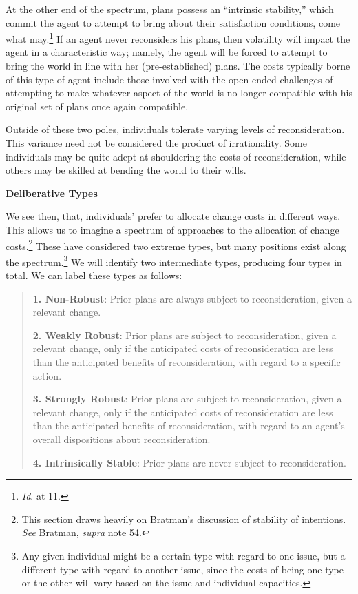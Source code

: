 At the other end of the spectrum, plans possess an ``intrinsic
stability,'' which commit the agent to attempt to bring about their
satisfaction conditions, come what may.\footnote{\emph{Id}. at 11.} If
an agent never reconsiders his plans, then volatility will impact the
agent in a characteristic way; namely, the agent will be forced to
attempt to bring the world in line with her (pre-established) plans. The
costs typically borne of this type of agent include those involved with
the open-ended challenges of attempting to make whatever aspect of the
world is no longer compatible with his original set of plans once again
compatible.

Outside of these two poles, individuals tolerate varying levels of
reconsideration. This variance need not be considered the product of
irrationality. Some individuals may be quite adept at shouldering the
costs of reconsideration, while others may be skilled at bending the
world to their wills.

\textbf{Deliberative Types}

We see then, that, individuals' prefer to allocate change costs in
different ways. This allows us to imagine a spectrum of approaches to
the allocation of change costs.\footnote{This section draws heavily on
  Bratman's discussion of stability of intentions. \emph{See} Bratman,
  \emph{supra} note 54.} These have considered two extreme types, but
many positions exist along the spectrum.\footnote{Any given individual
  might be a certain type with regard to one issue, but a different type
  with regard to another issue, since the costs of being one type or the
  other will vary based on the issue and individual capacities.} We will
identify two intermediate types, producing four types in total. We can
label these types as follows:

\begin{quote}
\textbf{1. Non-Robust}: Prior plans are always subject to
reconsideration, given a relevant change.

\textbf{2. Weakly Robust}: Prior plans are subject to reconsideration,
given a relevant change, only if the anticipated costs of
reconsideration are less than the anticipated benefits of
reconsideration, with regard to a specific action.

\textbf{3. Strongly Robust}: Prior plans are subject to reconsideration,
given a relevant change, only if the anticipated costs of
reconsideration are less than the anticipated benefits of
reconsideration, with regard to an agent's overall dispositions about
reconsideration.

\textbf{4. Intrinsically Stable}: Prior plans are never subject to
reconsideration.
\end{quote}

